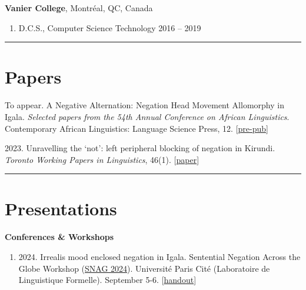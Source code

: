 \documentclass[margin,line]{resume}
\begin{document}
\begin{resume}
	\textbf{Vanier College}, Montr\'{e}al, QC, Canada
	\begin{enumerate}[-, leftmargin=1em, topsep=2pt]
		\item[]  D.C.S., Computer Science Technology \hfill 2016 -- 2019
	\end{enumerate}

	\vspace{-1em}\rule{\textwidth}{0.4pt}




	\vspace{-0.7em}

	\section{\mysidestyle Papers}

	 {To appear. A Negative Alternation: Negation Head Movement Allomorphy in Igala. \textit{Selected papers from the 54th Annual Conference on African Linguistics}. Contemporary African Linguistics: Language Science Press, 12. [\href{run:../papers/chaperon_acal_neg_move.pdf}{pre-pub}]}

	 {2023. Unravelling the `not': left peripheral blocking of negation in Kirundi. \textit{Toronto Working Papers in Linguistics}, 46(1). [\href{https://twpl.library.utoronto.ca/index.php/twpl/article/view/39257}{paper}]}%

	\vspace{-0.9em}\rule{\textwidth}{0.4pt}


	\vspace{-0.5em}

	\section{\mysidestyle Presentations}

	\textbf{Conferences \& Workshops}
	\begin{enumerate}[-, leftmargin=1em, topsep=2pt]
		
		\item[] {2024. Irrealis mood enclosed negation in Igala. Sentential Negation Across the Globe Workshop (\href{https://parissnag.com/conf}{SNAG 2024}). Universit\'{e} Paris Cit\'{e} (Laboratoire de Linguistique Formelle). September 5-6. [\href{https://parissnag.com/conf/program/chaperon}{handout}]}
		

\end{enumerate}
\end{resume}
\end{document}
